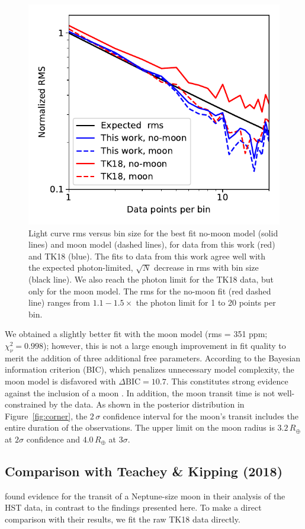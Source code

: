 \documentclass[twocolumn]{aastex62}
\begin{document}
\begin{figure}
\includegraphics[width = 0.5 \textwidth]{figures/fig2_rms.pdf}
    \caption{Light curve rms versus bin size for the best fit no-moon model (solid lines) and moon model (dashed lines), for data from this work (red) and TK18 (blue). The fits to data from this work agree well with the expected photon-limited, $\sqrt{N}$ decrease in rms with bin size (black line).  We also reach the photon limit for the TK18 data, but only for the moon model. The rms for the no-moon fit (red dashed line) ranges from $1.1 - 1.5\times$ the photon limit for 1 to 20 points per bin.}
 \label{fig:rms}
\end{figure}

We obtained a slightly better fit with the moon model (rms = 351 ppm; $\chi_\nu^2 = 0.998$); however, this is not a large enough improvement in fit quality to merit the addition of three additional free parameters.  According to the Bayesian information criterion (BIC), which penalizes unnecessary model complexity, the moon model is disfavored with $\Delta\mathrm{BIC} = 10.7$. This constitutes strong evidence against the inclusion of a moon \citep{kass95}.  In addition, the moon transit time is not well-constrained by the data. As shown in the posterior distribution in Figure~\ref{fig:corner}, the $2\,\sigma$ confidence interval for the moon's transit includes the entire duration of the observations.  The upper limit on the moon radius is $3.2\,R_\oplus$ at $2\sigma$ confidence and $4.0\,R_\oplus$ at $3\sigma$.



\subsection{Comparison with Teachey \& Kipping (2018)}
\cite{teachey18b} found evidence for the transit of a Neptune-size moon in their analysis of the HST data, in contrast to the findings presented here.  To make a direct comparison with their results, we fit the raw TK18 data directly. 
\end{document}
